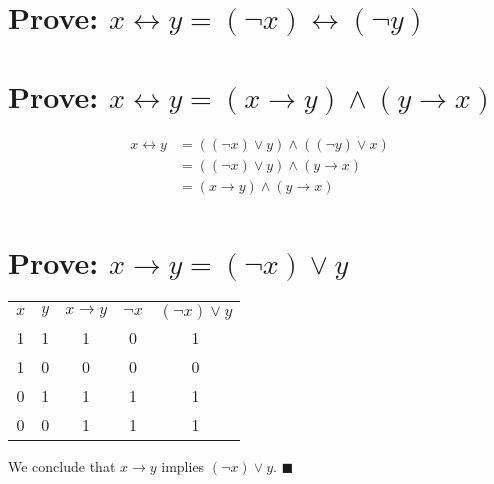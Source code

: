 \documentclass[12pt]{article}
\begin{document}
\section{Prove: $x\leftrightarrow y=(\lnot x)\leftrightarrow(\lnot y)$}
\section{Prove: $x\leftrightarrow y=(x\rightarrow y)\land(y\rightarrow x)$}
\begin{align*}
x\leftrightarrow y
&=((\lnot x)\lor y)\land((\lnot y)\lor x)\\
&=((\lnot x)\lor y)\land(y\rightarrow x)\\
&=(x\rightarrow y)\land(y\rightarrow x)\\
\end{align*}
\section{Prove: $x\rightarrow y=(\lnot x)\lor y$}
\begin{center}\begin{tabular}{c|c||c||c|c}
$x$&$y$&$x\rightarrow y$&$\lnot x$&$(\lnot x)\lor y$\\
1&1&1&0&1\\
1&0&0&0&0\\
0&1&1&1&1\\
0&0&1&1&1
\end{tabular}\end{center}
We conclude that $x\rightarrow y$ implies $(\lnot x)\lor y$. $\blacksquare$
\end{document}
